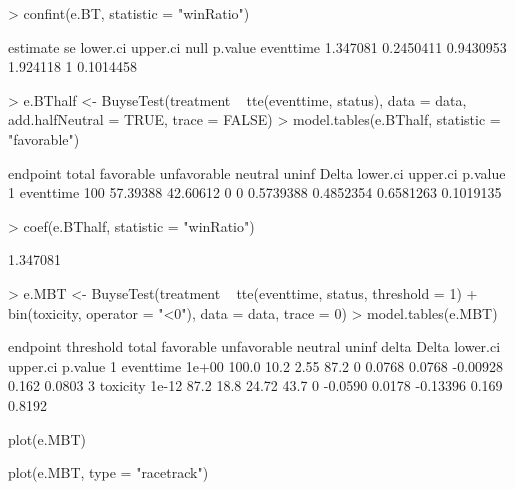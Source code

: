 \documentclass[12pt]{article}
\theoremstyle{definition}
\begin{document}
\begin{Rcode}
> confint(e.BT, statistic = "winRatio")
\end{Rcode}
\begin{Routput}
          estimate        se  lower.ci upper.ci null   p.value
eventtime 1.347081 0.2450411 0.9430953 1.924118    1 0.1014458
\end{Routput}

\begin{Rcode}
> e.BThalf <- BuyseTest(treatment ~ tte(eventtime, status),
                        data = data, add.halfNeutral = TRUE, trace = FALSE)
> model.tables(e.BThalf, statistic = "favorable")
\end{Rcode}
\begin{Routput}
   endpoint total favorable unfavorable neutral uninf     Delta  lower.ci  upper.ci   p.value
1 eventtime   100  57.39388    42.60612       0     0 0.5739388 0.4852354 0.6581263 0.1019135
\end{Routput}

\begin{Rcode}
> coef(e.BThalf, statistic = "winRatio")
\end{Rcode}
\begin{Routput}
[1] 1.347081
\end{Routput}

\clearpage

\begin{Rcode}
> e.MBT <- BuyseTest(treatment ~ tte(eventtime, status, threshold = 1) + bin(toxicity, operator = "<0"),
                     data = data, trace = 0)
> model.tables(e.MBT)
\end{Rcode}
\begin{Routput}
   endpoint threshold total favorable unfavorable neutral uninf   delta  Delta lower.ci upper.ci p.value
1 eventtime     1e+00 100.0      10.2        2.55    87.2     0  0.0768 0.0768 -0.00928    0.162  0.0803
3  toxicity     1e-12  87.2      18.8       24.72    43.7     0 -0.0590 0.0178 -0.13396    0.169  0.8192
\end{Routput}

\begin{Rcode}
plot(e.MBT)
\end{Rcode}

\begin{Rcode}
plot(e.MBT, type = "racetrack")
\end{Rcode}
\end{document}
